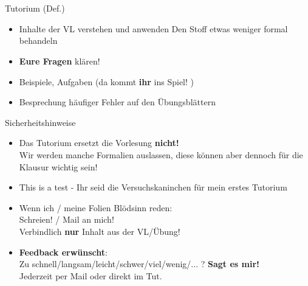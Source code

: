 






\section{}

\aboutMeFrame

\begin{frame}[t]{Tutorium (Def.)}
	\begin{itemize}[<+->]
		\item Inhalte der VL verstehen und anwenden
		\implitem Den Stoff etwas weniger formal behandeln
		\item \textbf{Eure Fragen} klären!
		\item Beispiele, Aufgaben (da kommt \textbf{ihr} ins Spiel! \smiley)
		\item Besprechung häufiger Fehler auf den Übungsblättern
	\end{itemize}
\end{frame}

\begin{frame}[t]{Sicherheitshinweise}
	\begin{itemize}[<+->]
		\item Das Tutorium ersetzt die Vorlesung \textbf{nicht!} \\
			Wir werden manche Formalien auslassen, diese können aber dennoch für die Klausur wichtig sein!
		\item This is a test - Ihr seid die Versuchskaninchen für mein erstes Tutorium 
		\item Wenn ich / meine Folien Blödsinn reden: \\
			Schreien! / Mail an mich! \\
			Verbindlich \textbf{nur} Inhalt aus der VL/Übung! 
		\item \textbf{Feedback erwünscht}: \\
			Zu schnell/langsam/leicht/schwer/viel/wenig/... ? \impl \textbf{Sagt es mir!}\\
			Jederzeit per Mail oder direkt im Tut.
	\end{itemize}
\end{frame}

